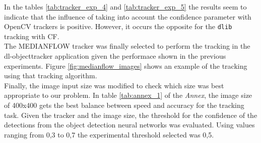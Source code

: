 In the tables \ref{tab:tracker_exp_4} and \ref{tab:tracker_exp_5} the results seem to indicate that the influence of taking into account the confidence parameter with OpenCV trackers is positive. However, it occurs the opposite for the \texttt{dlib} tracking with CF.\\
The MEDIANFLOW tracker was finally selected to perform the tracking in the dl-objecttracker application given the performace shown in the previous experiments. Figure \ref{fig:medianflow_images} shows an example of the tracking using that tracking algorithm.\\
Finally, the image input size was modified to check which size was best appropriate to our problem. In table \ref{tab:annex_1} of the \textit{Annex}, the image size of 400x400 gets the best balance between speed and accuracy for the tracking task. Given the tracker and the image size, the threshold for the confidence of the detections from the object detection neural networks was evaluated. Using values ranging from 0,3 to 0,7 the experimental threshold selected was 0,5.
